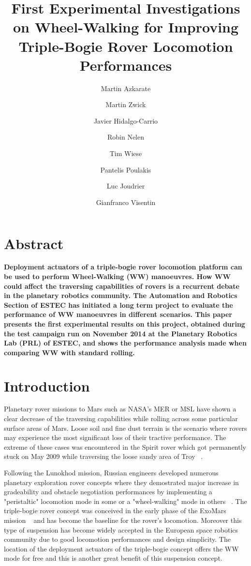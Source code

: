 \documentclass[a4paper,twocolumn]{esapub2005} %
\title{First Experimental Investigations on Wheel-Walking for Improving
Triple-Bogie Rover Locomotion Performances}
\author[1]{Martin Azkarate}
\author[1]{Martin Zwick}
\author[2]{Javier Hidalgo-Carrio}
\author[1]{Robin Nelen}
\author[3]{Tim Wiese}
\author[1]{Pantelis Poulakis}
\author[1]{Luc Joudrier}
\author[1]{Gianfranco Visentin}
\affil[1]{European Space Agency, ESA, Noordwijk, The Netherlands}
\affil[2]{Robotics Innovation Center, DFKI, Bremen, Germany}
\affil[3]{Technische Universit\"at M\"unchen, TUM, Munich, Germany}
\begin{document}

\maketitle

\section*{Abstract}

\textbf{Deployment actuators of a triple-bogie rover locomotion platform can be used to perform Wheel-Walking (WW) manoeuvres. How WW could affect the traversing capabilities of rovers is a recurrent debate in the planetary robotics community. The Automation and Robotics Section of ESTEC has initiated a long term project to evaluate the performance of WW manoeuvres in different scenarios. This paper presents the first experimental results on this project, obtained during the test campaign run on November 2014 at the Planetary Robotics Lab (PRL) of ESTEC, and shows the performance analysis made when comparing WW with standard rolling.}

\section{Introduction}

Planetary rover missions to Mars such as NASA's MER or MSL have shown a clear decrease of the traversing capabilities while rolling across some particular surface areas of Mars. Loose soil and fine dust terrain is the scenario where rovers may experience the most significant loss of their tractive performance. The extreme of these cases was encountered in the Spirit rover which got permanently stuck on May 2009 while traversing the loose sandy area of Troy ~\cite{SpiritTrap}.


Following the Lunokhod mission, Russian engineers developed numerous planetary exploration rover concepts where they demostrated major increase in gradeability and obstacle negotiation performances by implementing a "peristaltic" locomotion mode in some or a "wheel-walking" mode in others ~\cite{Ehrenfreund1998}. The triple-bogie rover concept was conceived in the early phase of the ExoMars mission ~\cite{Patel2010} and has become the baseline for the rover's locomotion. Moreover this type of suspension has become widely accepted in the European space robotics community due to good locomotion performances and design simplicity. The location of the deployment actuators of the triple-bogie concept offers the WW mode for free and this is another great benefit of this suspension concept.
\end{document}
